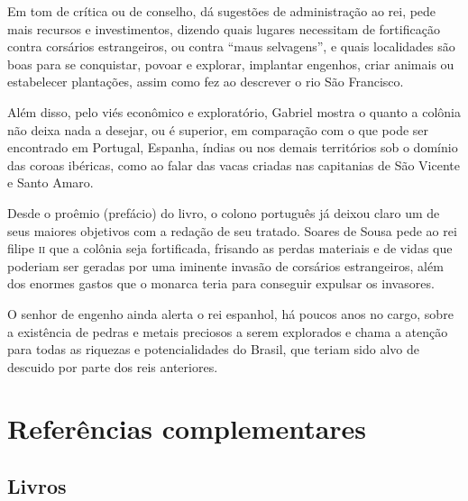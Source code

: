 \documentclass[12pt]{extarticle}
\begin{document}
Em tom de crítica ou de conselho, dá sugestões de administração ao rei,
pede mais recursos e investimentos, dizendo quais lugares necessitam de
fortificação contra corsários estrangeiros, ou contra ``maus
selvagens'', e quais localidades são boas para se conquistar, povoar e
explorar, implantar engenhos, criar animais ou estabelecer plantações,
assim como fez ao descrever o rio São Francisco.

Além disso, pelo viés econômico e exploratório, Gabriel mostra o quanto
a colônia não deixa nada a desejar, ou é superior, em comparação com o
que pode ser encontrado em Portugal, Espanha, índias ou nos demais
territórios sob o domínio das coroas ibéricas, como ao falar das vacas
criadas nas capitanias de São Vicente e Santo Amaro.

Desde o proêmio (prefácio) do livro, o colono português já deixou claro
um de seus maiores objetivos com a redação de seu tratado.
Soares de Sousa pede ao rei filipe \textsc{ii} que a colônia seja fortificada,
frisando as perdas materiais e de vidas que poderiam ser geradas por uma
iminente invasão de corsários estrangeiros, além dos enormes gastos que
o monarca teria para conseguir expulsar os invasores.

O senhor de engenho ainda alerta o rei espanhol, há poucos anos no
cargo, sobre a existência de pedras e metais preciosos a serem
explorados e chama a atenção para todas as riquezas e potencialidades do
Brasil, que teriam sido alvo de descuido por parte dos reis anteriores.

\section{Referências complementares}

\subsection{Livros}
\end{document}
